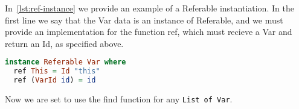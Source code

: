 In~\cref{lst:ref-instance} we provide an example of a Referable instantiation.
In the first line we say that the Var data is an instance of Referable, and we
must provide an implementation for the function ref, which must recieve a Var
and return an Id, as specified above.

\begin{lstlisting}[language=Haskell, frame=single, caption={A referable Instance}, label={lst:ref-instance}, float, floatplacement=H]
instance Referable Var where
  ref This = Id "this"
  ref (VarId id) = id
\end{lstlisting}
Now we are set to use the find function for any \texttt{List of Var}.


